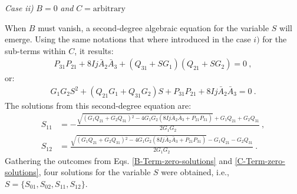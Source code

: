 \textit{Case ii)} $B=0$ \textit{and} $C=\text{arbitrary}$

When $B$ must vanish, a second-degree algebraic equation for the variable $S$ will emerge. Using the same notations that where introduced in the case $i)$ for the sub-terms within $C$, it results:
\begin{align}
    P_{31}P_{21}+8Ij\bar{A}_2\bar{A}_3+\left(Q_{31}+SG_1\right)\left(Q_{21}+SG_2\right)=0\ , \nonumber
\end{align}
or:
\begin{align}
    G_1G_2S^2+\left(Q_{21}G_1+Q_{31}G_2\right)S+P_{31}P_{21}+8Ij\bar{A}_2\bar{A}_3=0\ .
    \label{S-parameter-equations-set2}
\end{align}
The solutions from this second-degree equation are:
\begin{align}
    S_{11}&=-\frac{\sqrt{\left(G_1 Q_{21}+G_2 Q_{31}\right){}^2-4 G_1 G_2 \left(8 I j \bar{A}_2 \bar{A}_3+P_{21} P_{31}\right)}+G_1 Q_{21}+G_2 Q_{31}}{2 G_1 G_2}\ ,\nonumber\\
    S_{12}&=\frac{\sqrt{\left(G_1 Q_{21}+G_2 Q_{31}\right){}^2-4 G_1 G_2 \left(8 I j \bar{A}_2 \bar{A}_3+P_{21} P_{31}\right)}-G_1 Q_{21}-G_2 Q_{31}}{2 G_1 G_2}\ .
    \label{B-Term-zero-solutions}
\end{align}
Gathering the outcomes from Eqs. \ref{B-Term-zero-solutions} and \ref{C-Term-zero-solutions}, four solutions for the variable $S$ were obtained, i.e., $S=\{S_{01},S_{02},S_{11},S_{12}\}$. 

